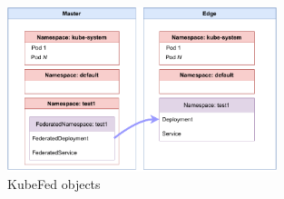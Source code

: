 \documentclass[MIC,Master,english]{twbook}%
\begin{document}
\begin{figure}[ht]
    \centering
    \includegraphics[width=0.70\textwidth]{PICs/drawio/kubefed-ressources.drawio.pdf}
    \caption{KubeFed objects}
    \label{fig:kubefed-resources}
\end{figure}
\end{document}
